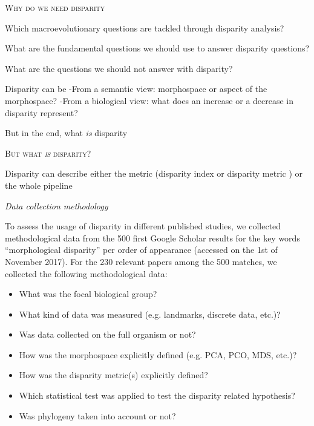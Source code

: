 \documentclass[12pt,letterpaper]{article}
\renewcommand{\section}[1]{%
\bigskip
\begin{center}
\begin{Large}
\normalfont\scshape #1
\medskip
\end{Large}
\end{center}}
\renewcommand{\subsection}[1]{%
\bigskip
\begin{center}
\begin{large}
\normalfont\itshape #1
\end{large}
\end{center}}
\begin{document}
\section{Why do we need disparity}
Which macroevolutionary questions are tackled through disparity analysis?

What are the fundamental questions we should use to answer disparity questions?

What are the questions we should not answer with disparity?


Disparity can be 
 -From a semantic view: morphospace or aspect of the morphospace?
 -From a biological view: what does an increase or a decrease in disparity represent?



But in the end, what \textit{is} disparity


\section{But what \textit{is} disparity?}

Disparity can describe either the metric (disparity index \citep{Hopkins2017} or disparity metric \citep{Wills2001}) or the whole pipeline \citep{Claddis,zelditch2012geometric}

\subsection{Data collection methodology}
To assess the usage of disparity in different published studies, we collected methodological data from the 500 first Google Scholar results for the key words ``morphological disparity'' per order of appearance (accessed on the 1st of November 2017).
For the 230 relevant papers among the 500 matches, we collected the following methodological data:

\begin{itemize}
    \item What was the focal biological group?
    \item What kind of data was measured (e.g. landmarks, discrete data, etc.)?
    \item Was data collected on the full organism or not?
    \item How was the morphospace explicitly defined (e.g. PCA, PCO, MDS, etc.)?
    \item How was the disparity metric(s) explicitly defined?
    \item Which statistical test was applied to test the disparity related hypothesis?
    \item Was phylogeny taken into account or not?
\end{itemize}
\end{document}
